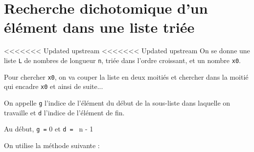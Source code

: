 	
%
%
%
%
%
%
%
%
%

	
\section{Recherche dichotomique d'un élément dans une liste triée}

<<<<<<< Updated upstream
<<<<<<< Updated upstream
On se donne une liste \texttt{L} de nombres de longueur \texttt{n}, {triée dans l'ordre croissant}, et un nombre \texttt{x0}. 

Pour chercher \texttt{x0}, on va couper la liste en deux moitiés et chercher dans la moitié qui encadre \texttt{x0} et ainsi de suite...

On appelle \texttt{g} l'indice de l'élément du début de la sous-liste dans laquelle on travaille et \texttt{d} l'indice de l'élément de fin.

Au début, \texttt{g =} {0} et \texttt{d = } {n - 1}

%

\medskip 
On utilise la méthode suivante :

